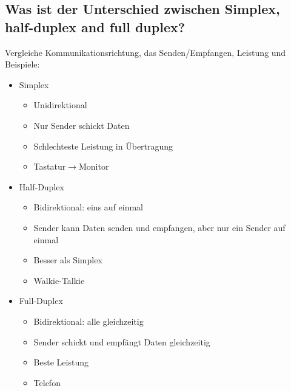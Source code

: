 \subsection*{Was ist der Unterschied zwischen \flqq{}Simplex\frqq, \flqq{}half-duplex\frqq{} and \flqq{}full duplex\frqq?}
Vergleiche Kommunikationsrichtung, das Senden/Empfangen, Leistung und Beispiele:
\begin{itemize}
    \item Simplex
    \begin{itemize}
        \item Unidirektional
        \item Nur Sender schickt Daten
        \item Schlechteste Leistung in Übertragung
        \item Tastatur$\rightarrow$Monitor
    \end{itemize}
    \item Half-Duplex
    \begin{itemize}
        \item Bidirektional: eins auf einmal
        \item Sender kann Daten senden und empfangen, aber nur ein Sender auf einmal
        \item Besser als Simplex
        \item Walkie-Talkie
    \end{itemize}
    \item Full-Duplex
    \begin{itemize}
        \item Bidirektional: alle gleichzeitig
        \item Sender schickt und empfängt Daten gleichzeitig
        \item Beste Leistung
        \item Telefon
    \end{itemize}
\end{itemize}

